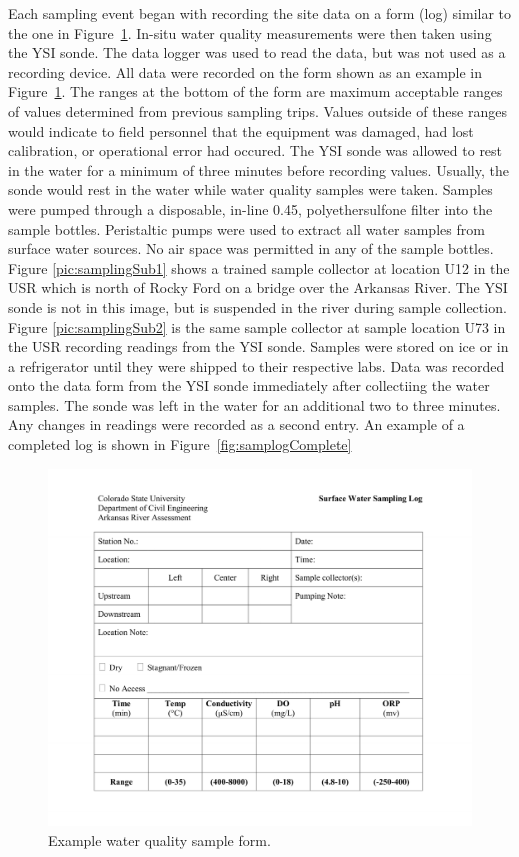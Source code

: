 \begin{linenumbers}
Each sampling event began with recording the site data on a form (log) similar to the one in Figure~\ref{fig:samplog}.  In-situ water quality measurements were then taken using the YSI sonde.  The data logger was used to read the data, but was not used as a recording device.  All data were recorded on the form shown as an example in Figure~\ref{fig:samplog}.  The ranges at the bottom of the form are maximum acceptable ranges of values determined from previous sampling trips.  Values outside of these ranges would indicate to field personnel that the equipment was damaged, had lost calibration, or operational error had occured.  The YSI sonde was allowed to rest in the water for a minimum of three minutes before recording values.  Usually, the sonde would rest in the water while water quality samples were taken.  Samples were pumped through a disposable, in-line \SI{0.45}{\micron}, polyethersulfone filter into the sample bottles.  Peristaltic pumps were used to extract all water samples from surface water sources.  No air space was permitted in any of the sample bottles.  Figure \ref{pic:samplingSub1} shows a trained sample collector at location U12 in the USR which is north of Rocky Ford on a bridge over the Arkansas River.  The YSI sonde is not in this image, but is suspended in the river during sample collection.  Figure \ref{pic:samplingSub2} is the same sample collector at sample location U73 in the USR recording readings from the YSI sonde.  Samples were stored on ice or in a refrigerator until they were shipped to their respective labs.  Data was recorded onto the data form from the YSI sonde immediately after collectiing the water samples.  The sonde was left in the water for an additional two to three minutes.  Any changes in readings were recorded as a second entry.  An example of a completed log is shown in Figure~\ref{fig:samplogComplete}

\begin{figure}[htbp]
	\centering
	\includegraphics[width=6in]{Figures/SampleLog}
	\caption[Example water quality sample form.]{Example water quality sample form.}
	\label{fig:samplog}
\end{figure}


\end{linenumbers}
